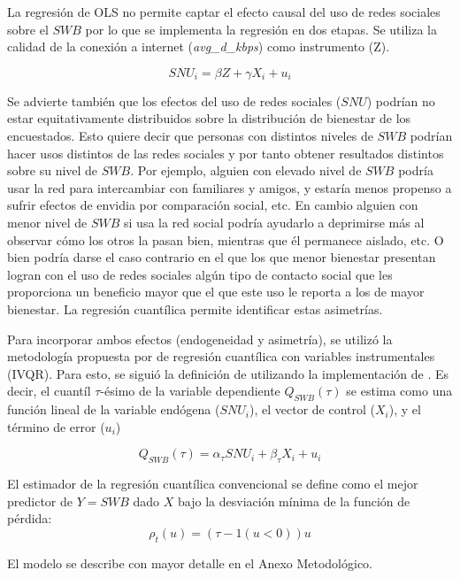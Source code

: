 \documentclass[11pt]{article}
\begin{document}
La regresión de OLS no permite captar el efecto causal del uso de redes sociales sobre el $SWB$ por lo que se implementa la regresión en dos etapas. Se utiliza la calidad de la conexión a internet (\textit{avg\_d\_kbps}) como instrumento (Z). 

\[SNU_i =  \beta Z + \gamma X_i + u_i \]

Se advierte también que los efectos del uso de redes sociales ($SNU$) podrían no estar equitativamente distribuidos sobre la distribución de bienestar de los encuestados. Esto quiere decir que personas con distintos niveles de $SWB$ podrían hacer usos distintos de las redes sociales y por tanto obtener resultados distintos sobre su nivel de $SWB$. Por ejemplo, alguien con elevado nivel de $SWB$ podría usar la red para intercambiar con familiares y amigos, y estaría menos propenso a sufrir efectos de envidia por comparación social, etc. En cambio alguien con menor nivel de $SWB$ si usa la red social podría ayudarlo a deprimirse más al observar cómo los otros la pasan bien, mientras que él permanece aislado, etc. O bien podría darse el caso contrario en el que los que menor bienestar presentan logran con el uso de redes sociales algún tipo de contacto social que les proporciona un beneficio mayor que el que este uso le reporta a los de mayor bienestar. La regresión cuantílica permite identificar estas asimetrías. 

Para incorporar ambos efectos (endogeneidad y asimetría), se utilizó la metodología propuesta por  de regresión cuantílica con variables instrumentales (IVQR). Para esto, se siguió la definición de  utilizando la implementación de . Es decir, el cuantíl $\tau$-ésimo de la variable dependiente $Q_{SWB} (\tau)$ se estima como una función lineal de la variable endógena ($SNU_i$), el vector de control ($X_i$), y el término de error ($u_i$)

 \[Q_{SWB}(\tau) =  \alpha_\tau SNU_i + \beta_\tau X_i + u_i \]

El estimador de la regresión cuantílica convencional se define como el mejor predictor de $Y=SWB$ dado $X$ bajo la desviación mínima de la función de pérdida: \[\rho_t(u)=(\tau-1(u<0))u\] 

El modelo se describe con mayor detalle en el Anexo Metodológico.  
\end{document}
